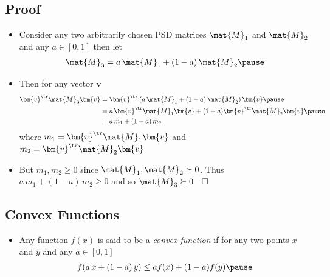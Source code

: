 \begin{slide}
\section[-2]{Proof}

\begin{PauseHighLight}
  \begin{itemize}
  \item Consider any two arbitrarily chosen PSD matrices $\mat{M}_1$
    and $\mat{M}_2$ and any $a\in[0,1]$ then let
    \begin{align*}
      \mat{M}_3 = a\,\mat{M}_1 + (1-a)\,\mat{M}_2\pause
    \end{align*}
  \item Then for any vector $\bm{v}$
    \begin{align*}
      \bm{v}^\tr \mat{M}_3 \bm{v}
      &= \bm{v}^\tr \left(  a\,\mat{M}_1 + (1-a)\,\mat{M}_2\right)
        \bm{v} \pause\\
      &=
        a\, \bm{v}^\tr \mat{M}_1 \bm{v} + (1-a)  \bm{v}^\tr \mat{M}_2
        \bm{v}\pause\\
      &= a\,m_1 + (1-a)\,m_2
    \end{align*}
    where $m_1 = \bm{v}^\tr \mat{M}_1 \bm{v}$ and $m_2 = \bm{v}^\tr
    \mat{M}_2 \bm{v}$\pause
  \item But $m_1,m_2\geq 0$ since $\mat{M}_1, \mat{M}_2 \succeq 0$.\pause{}  Thus $a\,m_1 + (1-a)\,m_2\geq 0$ and so
    $\mat{M}_3\succeq 0 \quad\square$\pause
  \end{itemize}
\end{PauseHighLight}

\end{slide}



\Outline %

\begin{slide}
  \section[-2]{Convex Functions}

  \pb
  \begin{itemize}
  \item Any function $f(x)$ is said to be a \emph{convex function} if
    for any two points $x$ and $y$ and any $a\in[0,1]$
    \begin{align*}
      f(a \,x + (1-a)\, y) \leq a f(x) + (1-a) f(y)\pause
    \end{align*}
    \begin{center}
      \pause
    \end{center}
  \end{itemize}
\end{slide}

